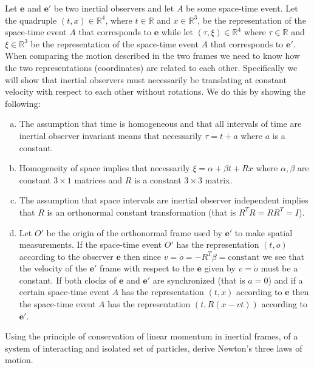 \documentclass[graybox,envcountchap,sectrefs]{svmonoMuga}
\begin{document}
\begin{exercise}\label{HomgenetyInertialFrame}
Let $\mathbf{e}$ and $\mathbf{e}'$ be two inertial observers and let $A$ be some space-time event. Let the quadruple $(t,x)\in \mathbb{R}^4$, where $t\in \mathbb{R}$ and  $x\in \mathbb{R}^3$, be the representation of the space-time event $A$ that corresponds to $\mathbf{e}$ while let  $(\tau,\xi)\in \mathbb{R}^4$ where $\tau\in \mathbb{R}$ and  $\xi\in \mathbb{R}^3$ be the representation of the space-time event $A$ that corresponds to $\mathbf{e}'$. 
When comparing the motion described in the two frames we need to know how the two representations (coordinates) are related to each other. Specifically we will show that inertial observers must necessarily be translating at constant velocity with respect to each other without rotations. We do this by showing the following:
\begin{enumerate}[(a)]
\item The assumption that time is homogeneous and that all intervals of time are inertial observer invariant means that necessarily $\tau=t+a$ where $a$ is a constant.
\item Homogeneity of space implies that necessarily  $\xi=\alpha+\beta t+R x$ where $\alpha,\beta$ are constant $3\times 1$ matrices and $R$ is a constant $3\times 3$ matrix. 
\item The assumption that space intervals are inertial observer independent implies that $R$ is an orthonormal constant transformation (that is $R^TR=RR^T=I$).
\item Let $O'$ be the origin of the orthonormal frame used by $\mathbf{e}'$ to make spatial measurements. If the space-time event $O'$ has the representation $(t,o)$ according to the observer $\mathbf{e}$ then since $v=\dot{o}=-R^{T}\beta=\mathrm{constant}$ we see that the velocity of the $\mathbf{e}'$ frame with respect to the $\mathbf{e}$ given by $v=\dot{o}$ must be a constant.  If both clocks of $\mathbf{e}$ and $\mathbf{e}'$ are synchronized (that is $a=0$) and if a certain space-time event $A$ has the representation $(t,x)$ according to $\mathbf{e}$ then the space-time event $A$ has the representation $(t,R(x-vt))$ according to $\mathbf{e}'$.
\end{enumerate}
\end{exercise}

\begin{exercise}\label{eq:NewtonsLaws}
Using the principle of conservation of linear momentum in inertial frames, of a system of interacting and isolated set of particles, derive Newton's three laws of motion.
\end{exercise}
\end{document}
